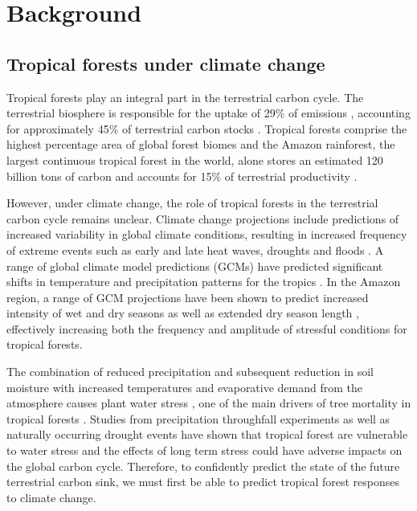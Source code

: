 \newpage
{}
\section*{Background}

{}
\subsection*{Tropical forests under climate change}

Tropical forests play an integral part in the terrestrial carbon cycle. The terrestrial biosphere is responsible for the uptake of 29\% of  emissions \citep{friedlingstein_2019}, accounting for approximately 45\% of terrestrial carbon stocks \citep{bonan_2008}. Tropical forests comprise the highest percentage area of global forest biomes \citep{pan_2011} and the Amazon rainforest, the largest continuous tropical forest in the world, \citep{malhi_2008} alone stores an estimated 120 billion tons of carbon \citep{phillips_2009} and accounts for 15\% of terrestrial productivity \citep{field_1998}.

However, under climate change, the role of tropical forests in the terrestrial carbon cycle remains unclear. Climate change projections include predictions of increased variability in global climate conditions, resulting in increased frequency of extreme events such as early and late heat waves, droughts and floods \citep{ipcc_2015}.  A range of global climate model predictions (GCMs) have predicted significant shifts in temperature and precipitation patterns for the tropics \citep{maloney_2014}. In the Amazon region, a range of GCM projections have been shown to predict increased intensity of wet and dry seasons \citep{lintner_2012} as well as extended dry season length \citep{malhi_2009, malhi_2008}, effectively increasing both the frequency and amplitude of stressful conditions for tropical forests.

The combination of reduced precipitation and subsequent reduction in soil moisture with increased temperatures and evaporative demand from the atmosphere causes plant water stress \citep{choat_2018}, one of the main drivers of tree mortality in tropical forests \citep{rowland_2015,mcdowell_2018}. Studies from precipitation throughfall experiments \citep{nepstad_2007}  as well as  naturally occurring drought events \citep{lewis_2011,phillips_2009} have shown that tropical forest are vulnerable to water stress and the effects of long term stress could have adverse impacts on the global carbon cycle. Therefore, to confidently predict the state of the future terrestrial carbon sink, we must first be able to predict tropical forest responses to climate change.

